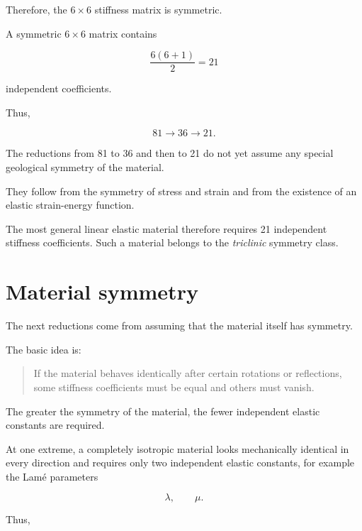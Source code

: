 \documentclass[11pt]{article}
\begin{document}
Therefore, the $6\times6$ stiffness matrix is symmetric.

A symmetric $6\times6$ matrix contains

\begin{equation}
    \frac{6(6+1)}{2} = 21
\end{equation}

independent coefficients.

Thus,

\begin{equation}
    \boxed{81 \longrightarrow 36 \longrightarrow 21}.
\end{equation}

\begin{tcolorbox}[title=Interpretation]
The reductions from 81 to 36 and then to 21 do not yet assume any special geological symmetry of the material.

They follow from the symmetry of stress and strain and from the existence of an elastic strain-energy function.
\end{tcolorbox}

The most general linear elastic material therefore requires 21 independent stiffness coefficients. Such a material belongs to the \emph{triclinic} symmetry class.

\section{Material symmetry}

The next reductions come from assuming that the material itself has symmetry.

The basic idea is:

\begin{quote}
If the material behaves identically after certain rotations or reflections, some stiffness coefficients must be equal and others must vanish.
\end{quote}

The greater the symmetry of the material, the fewer independent elastic constants are required.

At one extreme, a completely isotropic material looks mechanically identical in every direction and requires only two independent elastic constants, for example the Lam\'e parameters

\begin{equation}
    \lambda,\qquad \mu.
\end{equation}

Thus,
\end{document}
